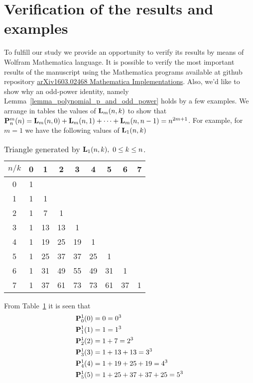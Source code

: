 \documentclass[12pt,letterpaper,oneside,reqno]{amsart}
\newcommand \polynomialP [4][P]{{\mathbf{#1}}\sp{#2} \sb{#3}(#4)}
\newcommand \polynomialL [4][L]{{\mathbf{#1}}\sb{#2}(#3,#4)}
\numberwithin{equation}{section}
\begin{document}
    \section{Verification of the results and examples}
    To fulfill our study we provide an opportunity to verify its results by means of Wolfram Mathematica language.
    It is possible to verify the most important results of the manuscript using the Mathematica programs available
    at github repository
    \href{https://github.com/kolosovpetro/arXiv1603.02468-Mathematica-Implementations}{\textsf{arXiv1603.02468 Mathematica Implementations}}.
    Also, we'd like to show why an odd-power identity, namely Lemma~\ref{lemma_polynomial_p_and_odd_power}
    holds by a few examples.
    We arrange in tables the values of $\polynomialL{m}{n}{k}$ to show
    that $\polynomialP{m}{n}{n}=\polynomialL{m}{n}{0}+\polynomialL{m}{n}{1}+\cdots+\polynomialL{m}{n}{n-1}=n^{2m+1}$.
    For example, for $m=1$ we have the following values of $\polynomialL{1}{n}{k}$
    \begin{table}[H]
        \begin{tabular}{c|cccccccc}
            $n/k$ &0 &1 &2 &3 &4 &5 &6 &7 \\[3px]
            \hline
            0 &1 & & & & & & & \\
            1 &1 &1 & & & & & & \\
            2 &1 &7 &1 & & & & & \\
            3 &1 &13 &13 &1 & & & & \\
            4 &1 &19 &25 &19 &1 & & & \\
            5 &1 &25 &37 &37 &25 &1 & & \\
            6 &1 &31 &49 &55 &49 &31 &1 & \\
            7 &1 &37 &61 &73 &73 &61 &37 &1
        \end{tabular}
        \caption{Triangle generated by $\polynomialL{1}{n}{k}, \ 0 \leq k \leq n$.}
            \label{tab_3}
    \end{table}
    From Table~\ref{tab_3} it is seen that
    \begin{equation*}
        \begin{split}
            \polynomialP{1}{0}{0} &= 0 = 0^3 \\
            \polynomialP{1}{1}{1} &= 1 = 1^3 \\
            \polynomialP{1}{2}{2} &= 1+7 = 2^3 \\
            \polynomialP{1}{3}{3} &= 1+13+13 = 3^3 \\
            \polynomialP{1}{4}{4} &= 1+19+25+19 = 4^3 \\
            \polynomialP{1}{5}{5} &= 1+25+37+37+25 = 5^3
        \end{split}
    \end{equation*}
\end{document}
